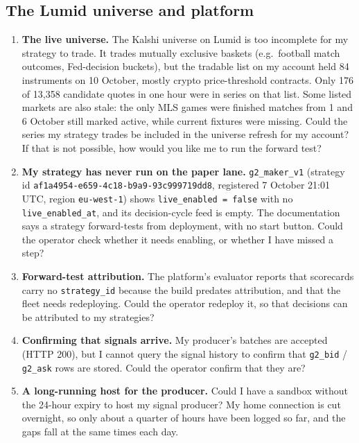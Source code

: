 \documentclass[11pt,a4paper]{article}
\begin{document}
\subsection*{The Lumid universe and platform}
\begin{enumerate}[resume]
  \item \textbf{The live universe.} The Kalshi universe on Lumid is too incomplete for my strategy to trade.
        It trades mutually exclusive baskets (e.g.\ football match outcomes, Fed-decision buckets), but the tradable
        list on my account held 84 instruments on 10 October, mostly crypto price-threshold contracts. Only 176 of
        13,358 candidate quotes in one hour were in series on that list. Some listed markets are also stale: the
        only MLS games were finished matches from 1 and 6 October still marked active, while current fixtures were
        missing. Could the series my strategy trades be included in the universe refresh for my account? If that
        is not possible, how would you like me to run the forward test?
  \item \textbf{My strategy has never run on the paper lane.} \texttt{g2\_maker\_v1} (strategy id
        \texttt{af1a4954-e659-4c18-b9a9-93c999719dd8}, registered 7 October 21:01 UTC, region
        \texttt{eu-west-1}) shows \texttt{live\_enabled = false} with no \texttt{live\_enabled\_at}, and its
        decision-cycle feed is empty. The documentation says a strategy forward-tests from deployment, with no
        start button. Could the operator check whether it needs enabling, or whether I have missed a step?
  \item \textbf{Forward-test attribution.} The platform's evaluator reports that scorecards carry no
        \texttt{strategy\_id} because the build predates attribution, and that the fleet needs redeploying. Could
        the operator redeploy it, so that decisions can be attributed to my strategies?
  \item \textbf{Confirming that signals arrive.} My producer's batches are accepted (HTTP 200), but I cannot query
        the signal history to confirm that \texttt{g2\_bid} / \texttt{g2\_ask} rows are stored. Could the operator
        confirm that they are?
  \item \textbf{A long-running host for the producer.} Could I have a sandbox without the 24-hour expiry to host my
        signal producer? My home connection is cut overnight, so only about a quarter of hours have been logged
        so far, and the gaps fall at the same times each day.
\end{enumerate}
\end{document}
